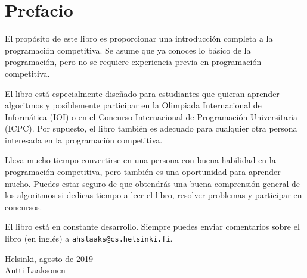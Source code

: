 \chapter*{Prefacio}

El propósito de este libro es proporcionar
una introducción completa a la programación competitiva.
Se asume que ya
conoces lo básico de la programación, pero no se requiere
experiencia previa en programación competitiva.

El libro está especialmente diseñado para
estudiantes que quieran aprender algoritmos y
posiblemente participar en
la Olimpiada Internacional de Informática (IOI) o
en el Concurso Internacional de Programación Universitaria (ICPC).
Por supuesto, el libro también es adecuado para
cualquier otra persona interesada en la programación competitiva.

Lleva mucho tiempo convertirse en una persona con buena habilidad
en la programación competitiva, pero también es una oportunidad para aprender mucho.
Puedes estar seguro de que obtendrás
una buena comprensión general de los algoritmos
si dedicas tiempo a leer el libro,
resolver problemas y participar en concursos.

El libro está en constante desarrollo.
Siempre puedes enviar comentarios sobre el libro (en inglés) a
\texttt{ahslaaks@cs.helsinki.fi}.

\begin{flushright}
    Helsinki, agosto de 2019 \\
    Antti Laaksonen
\end{flushright}
